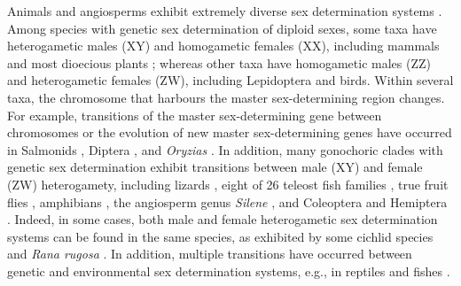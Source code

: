 \documentclass[12pt]{article}
\begin{document}
Animals and angiosperms exhibit extremely diverse sex determination systems \citep[reviewed in][]{Bull:1983vi,Charlesworth:2010it,Beukeboom:2014vb,Bachtrog:2014bx}. 
Among species with genetic sex determination of diploid sexes, some taxa have heterogametic males (XY) and homogametic females (XX), including %
mammals and most dioecious plants \citep{Ming:2011iy}; whereas other taxa have homogametic males (ZZ) and heterogametic females (ZW), including Lepidoptera and birds. 
Within several taxa, the chromosome that harbours the master sex-determining region changes. 
For example, transitions of the master sex-determining gene between chromosomes or the evolution of new master sex-determining genes have occurred in Salmonids \citep{Li:2011fm,Yano:2012di}, Diptera \citep{Vicoso:2015hf}, and \textit{Oryzias} \citep{Myosho:2012fv}.
In addition, many gonochoric clades with genetic sex determination exhibit transitions between male (XY) and female (ZW) heterogamety, including lizards \citep{Ezaz:2009tk}, eight of 26 teleost fish families \citep{Mank:2006bt}, true fruit flies \citep[Tephritids,][]{Vicoso:2015hf}, amphibians \citep{Hillis:1990gu}, the angiosperm genus \textit{Silene} \citep{Slancarova:2013dq}, and Coleoptera and Hemiptera \citep[][plate 2]{Beukeboom:2014vb}.
Indeed, in some cases, both male and female heterogametic sex determination systems can be found in the same species, as exhibited by some cichlid species \citep{Ser:2010iq} and \textit{Rana rugosa} \citep{Ogata:2007jm}.
In addition, multiple transitions have occurred between genetic and environmental sex determination systems, e.g., in reptiles and fishes \citep{Conover:1987in,Mank:2006bt,Pokorna:2009ui,Ezaz:2009tk,Pen:2010kk,Holleley:2015hc}.

\end{document}

